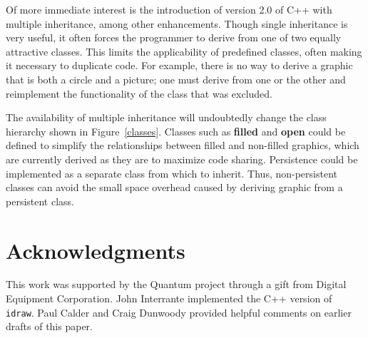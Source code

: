 Of more immediate interest is the introduction of version 2.0 of C++ 
\cite{c++:evolution} with multiple inheritance, among other enhancements.
Though single inheritance is very useful, it often forces the programmer to
derive from one of two equally attractive classes.  This limits the
applicability of predefined classes, often making it necessary to duplicate
code.  For example, there is no way to derive a graphic that is both a
circle and a picture; one must derive from one or the other and reimplement
the functionality of the class that was excluded.  

The availability of multiple inheritance will undoubtedly change the class
hierarchy shown in Figure~\ref{classes}.  Classes such as
{\bf filled} and {\bf open} could be defined to simplify the relationships
between filled and non-filled graphics, which are currently derived as they
are to maximize code sharing.  Persistence could be implemented as a
separate class from which to inherit. Thus, \mbox{non-persistent}
classes can avoid the small space overhead
caused by deriving graphic from a persistent class.

\section*{Acknowledgments}

This work was supported by the Quantum project through a gift from Digital
Equipment Corporation.  John Interrante implemented the C++ version of {\tt
idraw}.  Paul Calder and Craig Dunwoody provided helpful comments on earlier
drafts of this paper.





